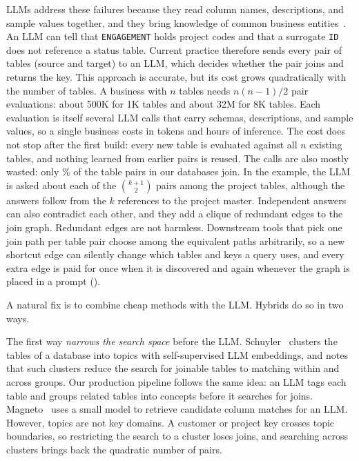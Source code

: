  LLMs address these failures because they read column names, descriptions, and sample values together, and they bring knowledge of common business entities~\cite{dataWrangleNarayan2022}.
An LLM can tell that \texttt{ENGAGEMENT} holds project codes and that a surrogate \texttt{ID} does not reference a status table.
Current practice therefore sends every pair of tables (source and target) to an LLM, which decides whether the pair joins and returns the key.
This approach is accurate, but its cost grows quadratically with the number of tables.
A business with $n$ tables needs $n(n-1)/2$ pair evaluations: about 500K for 1K tables and about 32M for 8K tables.
Each evaluation is itself several LLM calls that carry schemas, descriptions, and sample values, so a single business costs  in tokens and  hours of inference.
The cost does not stop after the first build: every new table is evaluated against all $n$ existing tables, and nothing learned from earlier pairs is reused.
The calls are also mostly wasted: only \% of the table pairs in our databases join.
In the example, the LLM is asked about each of the $\binom{k+1}{2}$ pairs among the project tables, although the answers follow from the $k$ references to the project master.
Independent answers can also contradict each other, and they add a clique of redundant edges to the join graph.
Redundant edges are not harmless.
Downstream tools that pick one join path per table pair choose among the equivalent paths arbitrarily, so a new shortcut edge can silently change which tables and keys a query uses, and every extra edge is paid for once when it is discovered and again whenever the graph is placed in a prompt ().

 A natural fix is to combine cheap methods with the LLM.
Hybrids do so in two ways.

The first way \emph{narrows the search space} before the LLM.
Schuyler~\cite{Schuyler} clusters the tables of a database into topics with self-supervised LLM embeddings, and notes that such clusters reduce the search for joinable tables to matching within and across groups.
Our production pipeline follows the same idea: an LLM tags each table and groups related tables into concepts before it searches for joins.
Magneto~\cite{Magneto} uses a small model to retrieve candidate column matches for an LLM.
However, topics are not key domains.
A customer or project key crosses topic boundaries, so restricting the search to a cluster loses joins, and searching across clusters brings back the quadratic number of pairs.

